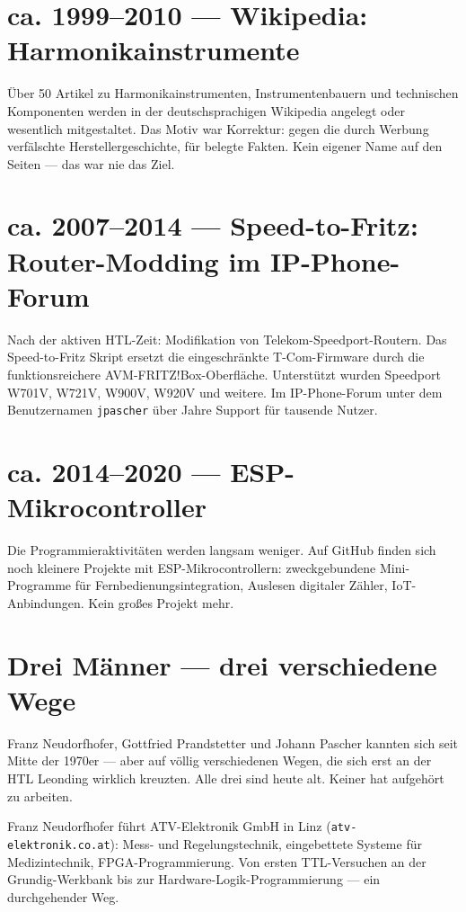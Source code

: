 \documentclass[11pt]{report}
\begin{document}
\section{ca. 1999--2010 --- Wikipedia: Harmonikainstrumente}

Über 50 Artikel zu Harmonikainstrumenten, Instrumentenbauern und technischen Komponenten werden in der deutschsprachigen Wikipedia angelegt oder wesentlich mitgestaltet. Das Motiv war Korrektur: gegen die durch Werbung verfälschte Herstellergeschichte, für belegte Fakten. Kein eigener Name auf den Seiten --- das war nie das Ziel.

\section{ca. 2007--2014 --- Speed-to-Fritz: Router-Modding im IP-Phone-Forum}

Nach der aktiven HTL-Zeit: Modifikation von Telekom-Speedport-Routern. Das \glqq Speed-to-Fritz Skript\grqq{} ersetzt die eingeschränkte T-Com-Firmware durch die funktionsreichere AVM-FRITZ!Box-Oberfläche. Unterstützt wurden Speedport W701V, W721V, W900V, W920V und weitere. Im IP-Phone-Forum unter dem Benutzernamen \texttt{jpascher} über Jahre Support für tausende Nutzer.

\section{ca. 2014--2020 --- ESP-Mikrocontroller}

Die Programmieraktivitäten werden langsam weniger. Auf GitHub finden sich noch kleinere Projekte mit ESP-Mikrocontrollern: zweckgebundene Mini-Programme für Fernbedienungsintegration, Auslesen digitaler Zähler, IoT-Anbindungen. Kein großes Projekt mehr.

\section{Drei Männer --- drei verschiedene Wege}

Franz Neudorfhofer, Gottfried Prandstetter und Johann Pascher kannten sich seit Mitte der 1970er --- aber auf völlig verschiedenen Wegen, die sich erst an der HTL Leonding wirklich kreuzten. Alle drei sind heute alt. Keiner hat aufgehört zu arbeiten.

Franz Neudorfhofer führt ATV-Elektronik GmbH in Linz (\texttt{atv-elektronik.co.at}): Mess- und Regelungstechnik, eingebettete Systeme für Medizintechnik, FPGA-Programmierung. Von ersten TTL-Versuchen an der Grundig-Werkbank bis zur Hardware-Logik-Programmierung --- ein durchgehender Weg.
\end{document}
